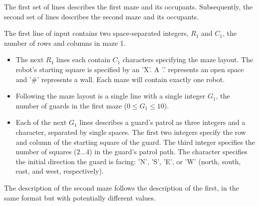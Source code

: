 The first set of lines describes the first maze and its occupants. Subsequently, the second set of lines describes the second maze and its occupants.

The first line of input contains two space-separated integers, $R_1$ and $C_1$, the number of rows and columns in maze 1.

\begin{itemize}
\item The next $R_1$ lines each contain $C_1$ characters specifying the maze layout. The robot's starting square is specified by an 'X'. A '.' represents an open space and '\#' represents a wall. Each maze will contain exactly one robot. 

\item Following the maze layout is a single line with a single integer $G_1$, the number of guards in the first maze ($0 \le G_1 \le 10$).

\item Each of the next $G_1$ lines describes a guard's patrol as three integers and a character, separated by single spaces. The first two integers specify the row and column of the starting square of the guard. The third integer specifies the number of squares ($2 \ldots 4$) in the guard's patrol path. The character specifies the initial direction the guard is facing: 'N', 'S', 'E', or 'W' (north, south, east, and west, respectively).
\end{itemize}

The description of the second maze follows the description of the first, in the same format but with potentially different values.